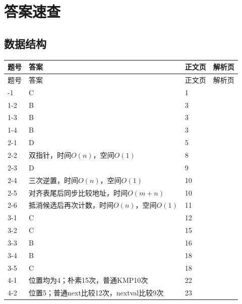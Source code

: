 \documentclass{sidenotes-simplex}
\begin{document}
\section*{答案速查}

\subsection*{数据结构}
{\fontsize{9.3}{12}\selectfont
\begin{longtable}{@{}p{18mm}p{87mm}p{20mm}p{20mm}@{}}\toprule 题号 & 答案 & 正文页 & 解析页 \\ \midrule\endfirsthead\toprule 题号 & 答案 & 正文页 & 解析页 \\ \midrule\endhead\bottomrule\endfoot
1-1 & C & 1 & \hyperref[a:DS01-E01]{\pageref*{a:DS01-E01}} \\
1-2 & B & 3 & \hyperref[a:DS01-E02]{\pageref*{a:DS01-E02}} \\
1-3 & B & 3 & \hyperref[a:DS01-E03]{\pageref*{a:DS01-E03}} \\
1-4 & B & 3 & \hyperref[a:DS01-E04]{\pageref*{a:DS01-E04}} \\
2-1 & D & 5 & \hyperref[a:DS02-E01]{\pageref*{a:DS02-E01}} \\
2-2 & 双指针，时间\(O(n)\)，空间\(O(1)\) & 8 & \hyperref[a:DS02-E02]{\pageref*{a:DS02-E02}} \\
2-3 & D & 9 & \hyperref[a:DS02-E03]{\pageref*{a:DS02-E03}} \\
2-4 & 三次逆置，时间\(O(n)\)，空间\(O(1)\) & 10 & \hyperref[a:DS02-E04]{\pageref*{a:DS02-E04}} \\
2-5 & 对齐表尾后同步比较地址，时间\(O(m+n)\) & 10 & \hyperref[a:DS02-E05]{\pageref*{a:DS02-E05}} \\
2-6 & 抵消候选后再次计数，时间\(O(n)\)，空间\(O(1)\) & 11 & \hyperref[a:DS02-E06]{\pageref*{a:DS02-E06}} \\
3-1 & C & 12 & \hyperref[a:DS03-E01]{\pageref*{a:DS03-E01}} \\
3-2 & C & 15 & \hyperref[a:DS03-E02]{\pageref*{a:DS03-E02}} \\
3-3 & B & 16 & \hyperref[a:DS03-E05]{\pageref*{a:DS03-E05}} \\
3-4 & B & 18 & \hyperref[a:DS03-E03]{\pageref*{a:DS03-E03}} \\
3-5 & C & 18 & \hyperref[a:DS03-E04]{\pageref*{a:DS03-E04}} \\
4-1 & 位置均为4；朴素15次，普通KMP10次 & 22 & \hyperref[a:DS04-E01]{\pageref*{a:DS04-E01}} \\
4-2 & 位置5；普通next比较12次，nextval比较9次 & 23 & \hyperref[a:DS04-E02]{\pageref*{a:DS04-E02}} \\

\end{longtable}}
\end{document}
